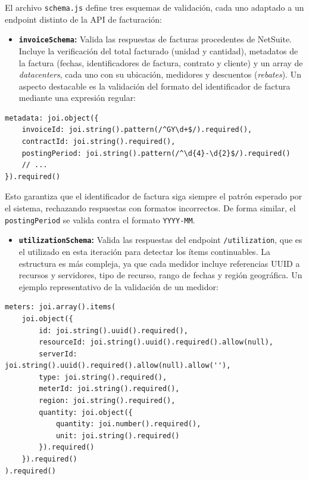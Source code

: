 El archivo \texttt{schema.js} define tres esquemas de validación, cada uno adaptado a un endpoint distinto de la API de facturación:

\begin{itemize}
    \item \textbf{\texttt{invoiceSchema}:} Valida las respuestas de facturas procedentes de NetSuite. Incluye la verificación del total facturado (unidad y cantidad), metadatos de la factura (fechas, identificadores de factura, contrato y cliente) y un array de \textit{datacenters}, cada uno con su ubicación, medidores y descuentos (\textit{rebates}). Un aspecto destacable es la validación del formato del identificador de factura mediante una expresión regular:
\end{itemize}

\begin{lstlisting}[caption=Validación del formato de invoiceId, label=lst:invoice-pattern]
metadata: joi.object({
    invoiceId: joi.string().pattern(/^GY\d+$/).required(),
    contractId: joi.string().required(),
    postingPeriod: joi.string().pattern(/^\d{4}-\d{2}$/).required()
    // ...
}).required()
\end{lstlisting}

Esto garantiza que el identificador de factura siga siempre el patrón esperado por el sistema, rechazando respuestas con formatos incorrectos. De forma similar, el \texttt{postingPeriod} se valida contra el formato \texttt{YYYY-MM}.

\begin{itemize}
    \item \textbf{\texttt{utilizationSchema}:} Valida las respuestas del endpoint \texttt{/utilization}, que es el utilizado en esta iteración para detectar los ítems continuables. La estructura es más compleja, ya que cada medidor incluye referencias UUID a recursos y servidores, tipo de recurso, rango de fechas y región geográfica. Un ejemplo representativo de la validación de un medidor:
\end{itemize}

\begin{lstlisting}[caption=Validación de un medidor en utilizationSchema, label=lst:utilization-meter]
meters: joi.array().items(
    joi.object({
        id: joi.string().uuid().required(),
        resourceId: joi.string().uuid().required().allow(null),
        serverId: joi.string().uuid().required().allow(null).allow(''),
        type: joi.string().required(),
        meterId: joi.string().required(),
        region: joi.string().required(),
        quantity: joi.object({
            quantity: joi.number().required(),
            unit: joi.string().required()
        }).required()
    }).required()
).required()
\end{lstlisting}

